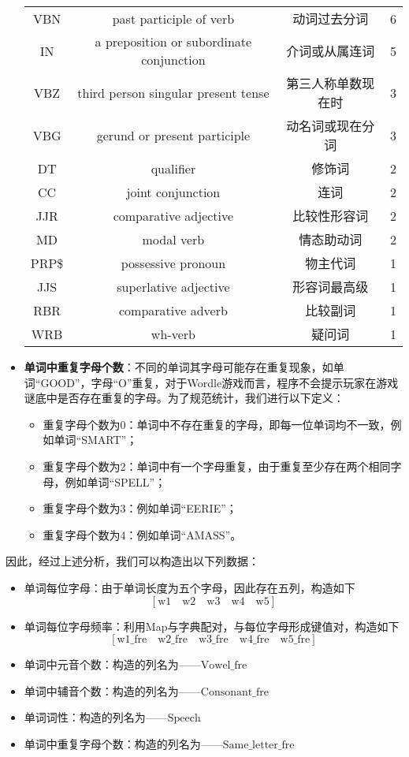 \documentclass{MathModeling}
\begin{document}
\begin{itemize}
\begin{table}[H]
{\begin{tabular}{cccc}
	  VBN   & past participle of verb & 动词过去分词 & 6 \\
	  IN    & a preposition or subordinate conjunction & 介词或从属连词 & 5 \\
	  VBZ   & third person singular present tense & 第三人称单数现在时 & 3 \\
	  VBG   & gerund or present participle & 动名词或现在分词 & 3 \\
	  DT    & qualifier & 修饰词   & 2 \\
	  CC    & joint conjunction & 连词 & 2 \\
	  JJR   & comparative adjective & 比较性形容词 & 2 \\
	  MD    & modal verb & 情态助动词 & 2 \\
	  PRP\$ & possessive pronoun & 物主代词  & 1 \\
	  JJS   & superlative adjective & 形容词最高级 & 1 \\
	  RBR   & comparative adverb & 比较副词  & 1 \\
	  WRB   & wh-verb & 疑问词   & 1 \\
	  \bottomrule
	  \end{tabular}}
	\label{tab:单词词性分析}
\end{table}
  
	\item \textbf{单词中重复字母个数}：不同的单词其字母可能存在重复现象，如单词“GOOD”，字母“O”重复，对于Wordle游戏而言，程序不会提示玩家在游戏谜底中是否存在重复的字母。为了规范统计，我们进行以下定义：
	\begin{itemize}
		\item {\heiti 重复字母个数为0}：单词中不存在重复的字母，即每一位单词均不一致，例如单词“SMART”；
		\item {\heiti 重复字母个数为2}：单词中有一个字母重复，由于重复至少存在两个相同字母，例如单词“SPELL”；
		\item {\heiti 重复字母个数为3}：例如单词“EERIE”；
		\item {\heiti 重复字母个数为4}：例如单词“AMASS”。
	\end{itemize}
\end{itemize}

因此，经过上述分析，我们可以构造出以下列数据：
	\begin{itemize}
		\item {\heiti 单词每位字母}：由于单词长度为五个字母，因此存在五列，构造如下
		$$
		\left[\text{w1}\quad \text{w2}\quad \text{w3}\quad \text{w4}\quad \text{w5}\right]
		$$
		\item {\heiti 单词每位字母频率}：利用Map与字典配对，与每位字母形成键值对，构造如下
		$$
		\left[\text{w1\_fre}\quad\text{w2\_fre}\quad\text{w3\_fre}\quad\text{w4\_fre}\quad\text{w5\_fre}\right]
		$$
		\item {\heiti 单词中元音个数}：构造的列名为——$\text{Vowel\_fre}$
		\item {\heiti 单词中辅音个数}：构造的列名为——$\text{Consonant\_fre}$
		\item {\heiti 单词词性}：构造的列名为——$\text{Speech}$
		\item {\heiti 单词中重复字母个数}：构造的列名为——$\text{Same\_letter\_fre}$
	\end{itemize}
	
\end{document}
